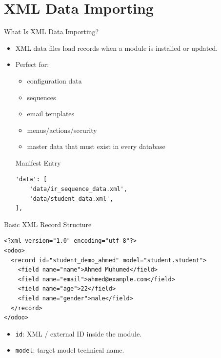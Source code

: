 \section{XML Data Importing}

\begin{frame}[fragile]{What Is XML Data Importing?}
	\begin{itemize}
		\item XML data files load records when a module is installed or updated.
		\item Perfect for:
		\begin{itemize}
			\item configuration data
			\item sequences
			\item email templates
			\item menus/actions/security
			\item master data that must exist in every database
		\end{itemize}
\begin{block}{Manifest Entry}
\begin{lstlisting}
'data': [
	'data/ir_sequence_data.xml',
	'data/student_data.xml',
],
\end{lstlisting}
\end{block}
	\end{itemize}
\end{frame}

\begin{frame}[fragile]{Basic XML Record Structure}
\begin{lstlisting}[style=xml]
<?xml version="1.0" encoding="utf-8"?>
<odoo>
  <record id="student_demo_ahmed" model="student.student">
	<field name="name">Ahmed Muhumed</field>
	<field name="email">ahmed@example.com</field>
	<field name="age">22</field>
	<field name="gender">male</field>
  </record>
</odoo>
\end{lstlisting}
	\begin{itemize}
		\item \texttt{id}: XML / external ID inside the module.
		\item \texttt{model}: target model technical name.
	\end{itemize}
\end{frame}

